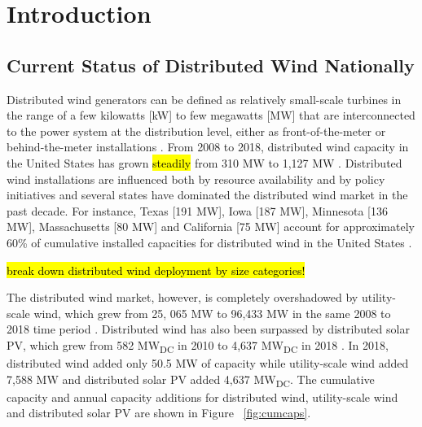 \section{Introduction}
\label{intro}

\subsection{Current Status of Distributed Wind Nationally}
\label{intr_distr_wind}

Distributed wind generators can be defined as relatively small-scale turbines in the range of a few kilowatts [kW] to few megawatts [MW] that are interconnected to the power system at the distribution level, either as front-of-the-meter or behind-the-meter installations \cite{ackermann_distributed_2001}. From 2008 to 2018, distributed wind capacity in the United States has grown \hl{steadily} from 310 MW to 1,127 MW \cite{orrell_2018_2019}. Distributed wind installations are influenced both by resource availability and by policy initiatives and several states have dominated the distributed wind market in the past decade. For instance, Texas [191 MW], Iowa [187 MW], Minnesota [136 MW], Massachusetts [80 MW] and California [75 MW] account for approximately 60\% of cumulative installed capacities for distributed wind in the United States \cite{orrell_2018_2019}. 

\hl{break down distributed wind deployment by size categories!}

The distributed wind market, however, is completely overshadowed by utility-scale wind, which grew from 25, 065 MW to 96,433 MW in the same 2008 to 2018 time period \cite{wiser_2018_2019}. Distributed wind has also been surpassed by distributed solar PV, which grew from 582 MW\textsubscript{DC} in 2010 to 4,637 MW\textsubscript{DC} in 2018 \cite{solar_energy_industries_association_us_2019}. In 2018, distributed wind added only 50.5 MW of capacity while utility-scale wind added 7,588 MW and distributed solar PV added 4,637 MW\textsubscript{DC}. The cumulative capacity and annual capacity additions for distributed wind, utility-scale wind and distributed solar PV are shown in Figure ~\ref{fig:cumcaps}. %


